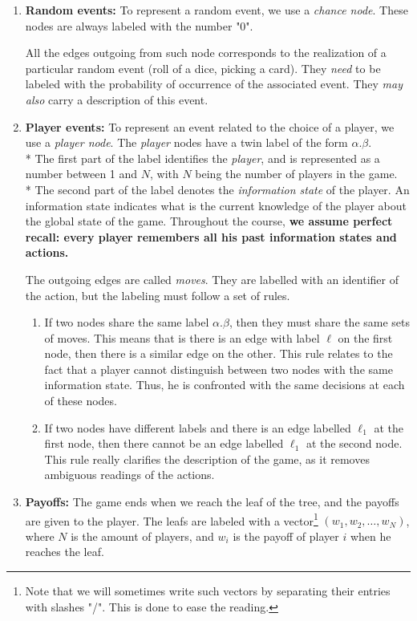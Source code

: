 \begin{enumerate}
\item \textbf{Random events:}
To represent a random event, we use a \emph{chance node}. 
These nodes are always labeled with the number "0".

All the edges outgoing from such node corresponds to the realization of a particular random event (roll of a dice, picking a card).
 They \emph{need} to be labeled with the probability of occurrence of the associated event. They \emph{may also} carry a description of this event.
 
\item \textbf{Player events:}
To represent an event related to the choice of a player, 
we use a \emph{player node}.
The \emph{player} nodes have a twin label of the form 
$\alpha.\beta$. \\*
 The first part of the label identifies the \emph{player}, 
 and is represented as a number between 1 and $N$, 
 with $N$ being the number of players in the game.\\*
The second part of the label 
 denotes the \emph{information state} of the player. 
 An information state indicates what is the current knowledge 
 of the player about the global state of the game. 
 Throughout the course, \textbf{we assume perfect recall: 
 every player remembers all his past information states and actions.}


The outgoing edges are called \emph{moves}. 
They are labelled with an identifier of the action, but the labeling must follow a set of rules.
\begin{enumerate}
\item If two nodes share the same label $\alpha.\beta$, then they must share the same sets of moves. 
This means that is there is an edge with label $\ell$ on the first node, then there is a similar edge on the other.
This rule relates to the fact that 
a player cannot distinguish between two nodes with the same information state.
Thus, he is confronted with the same decisions at each of these nodes.

\item If two nodes have different labels and there is an edge labelled $\ell_1$ at the first node, 
then there cannot be an edge labelled $\ell_1$ at the second node.
This rule really clarifies the description of the game, as it removes ambiguous readings of the actions.


\end{enumerate}
\item \textbf{Payoffs:} The game ends when we reach the leaf of the tree, and the payoffs are given to the player. 
The leafs are labeled with a vector\footnote{Note that we will sometimes write such vectors by separating their entries with slashes "/". This is done to ease the reading.} $(w_1, w_2, \ldots, w_N)$, where $N$ is the amount of players, and $w_i$ is the payoff of player $i$ when he reaches the leaf.
\end{enumerate}

